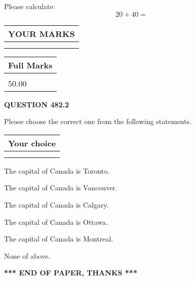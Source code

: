 \documentclass[12pt]{article}
\begin{document}
  
 
Please calculate:
\begin{equation}
20 +  %
40 = \nonumber
\end{equation}
 

 

 
  
\vspace{0.2in}
  
\noindent\begin{tabular}{|l|}
\hline
 YOUR MARKS  \\
\hline
 \\ 
 \\ 
\hline
\end{tabular}
\hspace{0.05in} \begin{tabular}{|l|}
\hline
 Full Marks  \\
\hline
 \\ 
50.00 \\
\hline
\end{tabular}
{\textbf{\Large{QUESTION
482.2 
}}}
  
  
Please choose the correct one from the following statements.
  
  
\noindent\hspace{3.0in} \begin{tabular}{|l|}
\hline
Your choice \\
\hline
 \\ 
 \\ 
\hline
\end{tabular}
  
  
 
 
The capital of Canada is Toronto.
 
 
The capital of Canada is Vancouver.
 
 
The capital of Canada is Calgary.
 
 
The capital of Canada is Ottawa.
 
 
The capital of Canada is Montreal.
 
 
 None of above.
 
 
   
   
 \vspace{0.2in}
 
   
   
   
   
\vspace{1.0in} 
{\textbf{\large{ *** END OF PAPER, THANKS *** }}} 
   
\end{document}
